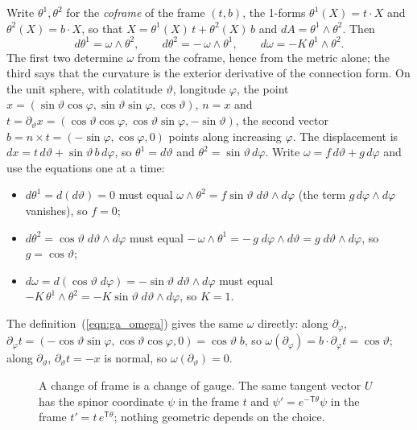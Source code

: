 \begin{rem}
\label{rem:structure}
Write $\theta^1, \theta^2$ for the \emph{coframe} of the frame $(t, b)$, the 1-forms $\theta^1(X) = t\cdot X$ and $\theta^2(X) = b \cdot X$, so that $X = \theta^1(X)\, t + \theta^2(X)\, b$ and $dA = \theta^1 \wedge \theta^2$. Then
\begin{equation*}
d\theta^1 = \omega \wedge \theta^2, \qquad d\theta^2 = -\,\omega\wedge\theta^1, \qquad d\omega = -K\, \theta^1 \wedge \theta^2 .
\end{equation*}
The first two determine $\omega$ from the coframe, hence from the metric alone; the third says that the curvature is the exterior derivative of the connection form. On the unit sphere, with colatitude $\vartheta$, longitude $\varphi$, the point $x = (\sin\vartheta\cos\varphi, \sin\vartheta\sin\varphi, \cos\vartheta)$, $n = x$ and $t = \partial_\vartheta x = (\cos\vartheta\cos\varphi, \cos\vartheta\sin\varphi, -\sin\vartheta)$, the second vector $b = n\times t = (-\sin\varphi, \cos\varphi, 0)$ points along increasing $\varphi$. The displacement is $dx = t\, d\vartheta + \sin\vartheta\, b\, d\varphi$, so $\theta^1 = d\vartheta$ and $\theta^2 = \sin\vartheta\, d\varphi$. Write $\omega = f\, d\vartheta + g\, d\varphi$ and use the equations one at a time:
\begin{itemize}
\item $d\theta^1 = d(d\vartheta) = 0$ must equal $\omega\wedge\theta^2 = f\sin\vartheta\; d\vartheta\wedge d\varphi$ (the term $g\,d\varphi\wedge d\varphi$ vanishes), so $f = 0$;
\item $d\theta^2 = \cos\vartheta\; d\vartheta\wedge d\varphi$ must equal $-\,\omega\wedge\theta^1 = -\,g\; d\varphi\wedge d\vartheta = g\; d\vartheta\wedge d\varphi$, so $g = \cos\vartheta$;
\item $d\omega = d(\cos\vartheta\; d\varphi) = -\sin\vartheta\; d\vartheta\wedge d\varphi$ must equal $-K\,\theta^1\wedge\theta^2 = -K\sin\vartheta\; d\vartheta\wedge d\varphi$, so $K = 1$.
\end{itemize}
The definition~(\ref{eqn:ga_omega}) gives the same $\omega$ directly: along $\partial_\varphi$, $\partial_\varphi t = (-\cos\vartheta\sin\varphi, \cos\vartheta\cos\varphi, 0) = \cos\vartheta\; b$, so $\omega(\partial_\varphi) = b\cdot\partial_\varphi t = \cos\vartheta$; along $\partial_\vartheta$, $\partial_\vartheta t = -x$ is normal, so $\omega(\partial_\vartheta) = 0$.
\end{rem}
\begin{figure}[t]
\centering
{}
\caption{A change of frame is a change of gauge. The same tangent vector $U$ has the spinor coordinate $\psi$ in the frame $t$ and $\psi' = e^{-\mathsf T\theta}\psi$ in the frame $t' = t\, e^{\mathsf T\theta}$; nothing geometric depends on the choice.}
\label{fig:gauge}
\end{figure}

